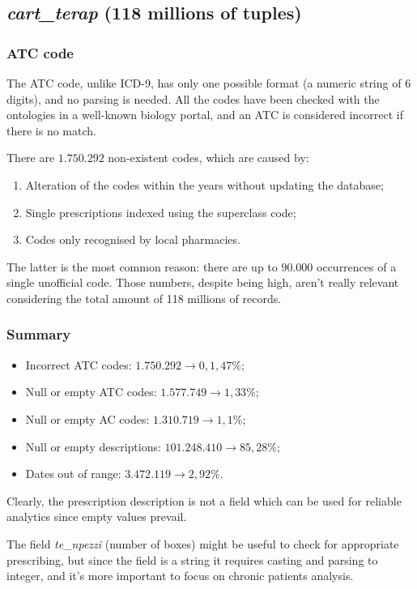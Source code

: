 \subsection{\textit{cart\_terap} (118 millions of tuples)}
\subsubsection{ATC code}
The ATC code, unlike ICD-9, has only one possible format (a numeric string of 6 digits), and no parsing is needed. All the codes have been checked with the ontologies in a well-known biology portal\cite{atc}, and an ATC is considered incorrect if there is no match.

There are $1.750.292$ non-existent codes, which are caused by:
\begin{enumerate}
	\item Alteration of the codes within the years without updating the database;
	\item Single prescriptions indexed using the superclass code;
	\item Codes only recognised by local pharmacies.
\end{enumerate}

The latter is the most common reason: there are up to $90.000$ occurrences of a single unofficial code. Those numbers, despite being high, aren't really relevant considering the total amount of 118 millions of records.

\subsubsection{Summary}
\begin{itemize}
	\item Incorrect ATC codes: $1.750.292 \rightarrow 0,1,47\%$;
	\item Null or empty ATC codes: $1.577.749 \rightarrow 1,33\%$;
	\item Null or empty AC codes: $1.310.719 \rightarrow 1,1\%$;
	\item Null or empty descriptions: $101.248.410 \rightarrow 85,28\%$;
	\item Dates out of range: $3.472.119 \rightarrow 2,92\%$.
\end{itemize}

Clearly, the prescription description is not a field which can be used for reliable analytics since empty values prevail.

The field \textit{te\_npezzi} (number of boxes) might be useful to check for appropriate prescribing, but since the field is a string it requires casting and parsing to integer, and it's more important to focus on chronic patients analysis.


